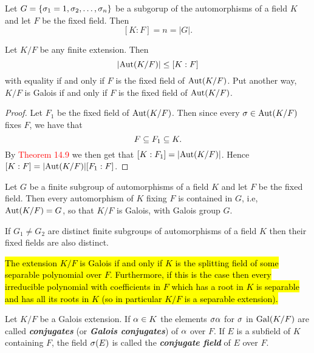 \nl

\begin{thm}
Let $G = \{\sigma_1 = 1, \sigma_2, \ldots, \sigma_n\}$ be a subgorup of the automorphisms of a field $K$ and let $F$ be the fixed field. Then
\[[K:F] = n = |G|.\]
\end{thm}

\nl

\begin{cor}
Let $K/F$ be any finite extension. Then
\[|\text{Aut}(K/F)|\leq [K:F]\]
with equality if and only if $F$ is the fixed field of $\text{Aut}(K/F)$. Put another way, $K/F$ is Galois if and only if $F$ is the fixed field of $\text{Aut}(K/F)$.
\end{cor}

\begin{proof}
Let $F_1$ be the fixed field of $\text{Aut}(K/F)$. Then since every $\sigma \in \text{Aut}(K/F)$ fixes $F$, we have that 
\[F\subseteq F_1\subseteq K.\]
By \textcolor{red}{Theorem 14.9} we then get that $[K:F_1] = |\text{Aut}(K/F)|$. Hence $[K:F] = |\text{Aut}(K/F)|[F_1:F]$.
\end{proof}

\nl

\begin{cor}
Let $G$ be a finite subgroup of automorphisms of a field $K$ and let $F$ be the fixed field. Then every automorphism of $K$ fixing $F$ is contained in $G$, i.e, $\text{Aut}(K/F) = G$, so that $K/F$ is Galois, with Galois group $G$.
\end{cor}

\nl

\begin{cor}
If $G_1\neq G_2$ are distinct finite subgroups of automorphisms of a field $K$ then their fixed fields are also distinct.
\end{cor}

\nl

\begin{thm}
\hl{The extension $K/F$ is Galois if and only if $K$ is the splitting field of some separable polynomial over $F$. Furthermore, if this is the case then every irreducible polynomial with coefficients in $F$ which has a root in $K$ is separable and has all its roots in $K$ (so in particular $K/F$ is a separable extension).}
\end{thm}

\nl

\begin{defn}
Let $K/F$ be a Galois extension. If $\alpha\in K$ the elements $\sigma \alpha$ for $\sigma$ in $\text{Gal}(K/F)$ are called \textit{\textbf{conjugates}} (or \textit{\textbf{Galois conjugates}}) of $\alpha$ over $F$. If $E$ is a subfield of $K$ containing $F$, the field $\sigma(E)$ is called the \textit{\textbf{conjugate field}} of $E$ over $F$.
\end{defn}

